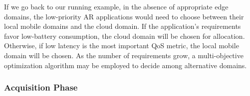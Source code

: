 


If we go back to our running example, in the absence of appropriate edge domains, the low-priority AR applications would need to choose between their local mobile domains and the cloud domain. If the application's requirements favor low-battery consumption, the cloud domain will be chosen for allocation. Otherwise, if low latency is the most important QoS metric, the local mobile domain will be chosen. As the number of requirements grow, a multi-objective optimization algorithm may be employed to decide among alternative domains.







\subsubsection*{Acquisition Phase}\label{sec:A3-E-acquisition}


